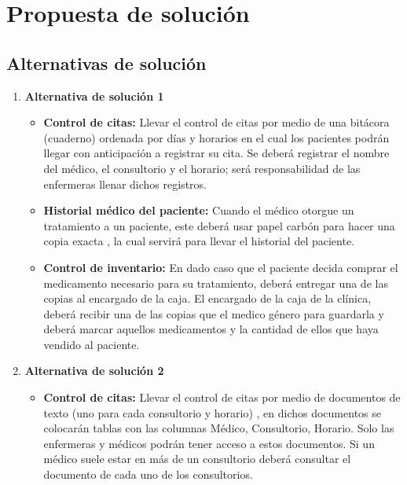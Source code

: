 \section{Propuesta de solución}

\subsection{Alternativas de solución}
\begin{enumerate}
\item \textbf{Alternativa de solución 1}
\begin{itemize}

\item \textbf{Control de citas: }Llevar el control de citas por medio de una bitácora (cuaderno) ordenada por días y horarios en el cual los pacientes podrán llegar con anticipación a registrar su cita. Se deberá registrar el nombre del médico, el consultorio y el horario; será responsabilidad de las enfermeras llenar dichos registros.\\

\item \textbf{Historial médico del paciente: }Cuando el médico otorgue un tratamiento a un paciente, este deberá usar papel carbón para hacer una copia exacta , la cual servirá para llevar el historial del paciente.\\

\item \textbf{Control de inventario: }En dado caso que el paciente decida comprar el medicamento necesario para su tratamiento, deberá entregar una de las copias al encargado de la caja. El encargado de la caja de la clínica, deberá recibir una de las copias que el medico género para guardarla y deberá marcar aquellos medicamentos y la cantidad de ellos que haya vendido al paciente.\\


\end{itemize}
\item \textbf{Alternativa de solución 2}
\begin{itemize}

\item \textbf{Control de citas: }Llevar el control de citas por medio de documentos de texto (uno para cada consultorio y horario) , en dichos documentos se colocarán tablas con las columnas Médico, Consultorio, Horario. Solo las enfermeras y médicos podrán tener acceso a estos documentos. Si un médico suele estar en más de un consultorio deberá consultar el documento de cada uno de los consultorios.\\


\end{itemize}
\end{enumerate}
